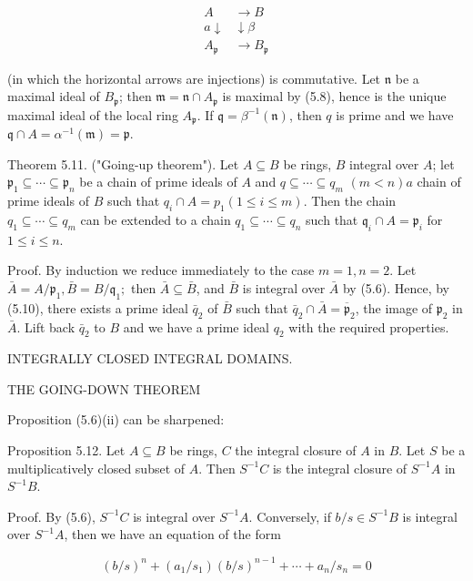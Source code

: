 \documentclass{standalone}
\theoremstyle{definition}
\theoremstyle{remark}
\begin{document}
\[
\begin{aligned}
A & \rightarrow B \\
a \downarrow & \downarrow \beta \\
A_{\mathfrak{p}} & \rightarrow B_{\mathfrak{p}}
\end{aligned}
\]

(in which the horizontal arrows are injections) is commutative. Let $\mathfrak{n}$ be a maximal ideal of $B_{\mathfrak{p}}$; then $\mathfrak{m}=\mathfrak{n} \cap A_{\mathfrak{p}}$ is maximal by (5.8), hence is the unique maximal ideal of the local ring $A_{\mathfrak{p}}$. If $\mathfrak{q}=\beta^{-1}(\mathfrak{n})$, then $q$ is prime and we have $\mathfrak{q} \cap A=\alpha^{-1}(\mathfrak{m})=\mathfrak{p}$.

Theorem 5.11. ("Going-up theorem"). Let $A \subseteq B$ be rings, $B$ integral over $A$; let $\mathfrak{p}_{1} \subseteq \cdots \subseteq \mathfrak{p}_{n}$ be a chain of prime ideals of $A$ and $q \subseteq \cdots \subseteq q_{m}$ $(m<n) a$ chain of prime ideals of $B$ such that $q_{i} \cap A=p_{1}(1 \leqslant i \leqslant m)$. Then the chain $q_{1} \subseteq \cdots \subseteq q_{m}$ can be extended to a chain $q_{1} \subseteq \cdots \subseteq q_{n}$ such that $\mathfrak{q}_{i} \cap A=\mathfrak{p}_{i}$ for $1 \leqslant i \leqslant n$.

Proof. By induction we reduce immediately to the case $m=1, n=2$. Let $\bar{A}=A / \mathfrak{p}_{1}, \bar{B}=B / \mathfrak{q}_{1} ;$ then $\bar{A} \subseteq \bar{B}$, and $\bar{B}$ is integral over $\bar{A}$ by (5.6). Hence, by (5.10), there exists a prime ideal $\bar{q}_{2}$ of $\bar{B}$ such that $\bar{q}_{2} \cap \bar{A}=\overline{\mathfrak{p}}_{2}$, the image of $\mathfrak{p}_{2}$ in $\bar{A}$. Lift back $\bar{q}_{2}$ to $B$ and we have a prime ideal $q_{2}$ with the required properties.

INTEGRALLY CLOSED INTEGRAL DOMAINS.

THE GOING-DOWN THEOREM

Proposition (5.6)(ii) can be sharpened:

Proposition 5.12. Let $A \subseteq B$ be rings, $C$ the integral closure of $A$ in $B$. Let $S$ be a multiplicatively closed subset of $A$. Then $S^{-1} C$ is the integral closure of $S^{-1} A$ in $S^{-1} B$.

Proof. By (5.6), $S^{-1} C$ is integral over $S^{-1} A$. Conversely, if $b / s \in S^{-1} B$ is integral over $S^{-1} A$, then we have an equation of the form

\[
(b / s)^{n}+\left(a_{1} / s_{1}\right)(b / s)^{n-1}+\cdots+a_{n} / s_{n}=0
\]
\end{document}
